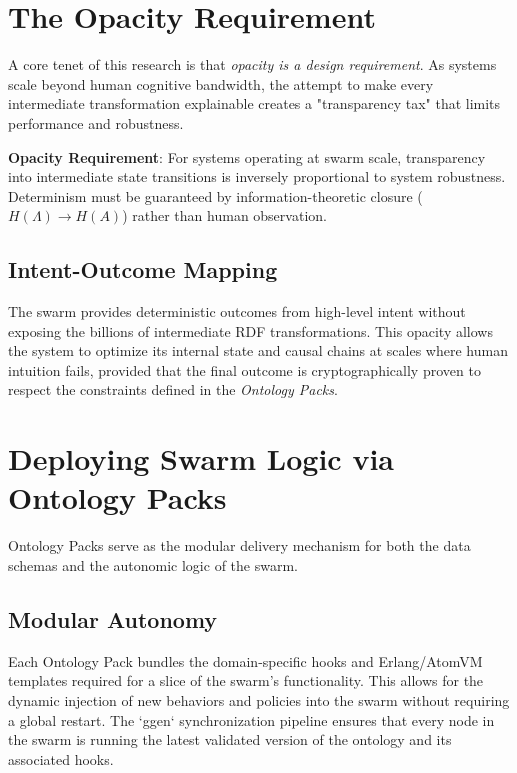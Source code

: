 \section{The Opacity Requirement}

A core tenet of this research is that \textit{opacity is a design requirement}. As systems scale beyond human cognitive bandwidth, the attempt to make every intermediate transformation explainable creates a "transparency tax" that limits performance and robustness.

\begin{tcolorbox}[colback=fusionblue!5!white,colframe=fusionblue!75!black]
    \textbf{Opacity Requirement}: For systems operating at swarm scale, transparency into intermediate state transitions is inversely proportional to system robustness. Determinism must be guaranteed by information-theoretic closure ($H(\Lambda) \to H(A)$) rather than human observation.
\end{tcolorbox}

\subsection{Intent-Outcome Mapping}
The swarm provides deterministic outcomes from high-level intent without exposing the billions of intermediate RDF transformations. This opacity allows the system to optimize its internal state and causal chains at scales where human intuition fails, provided that the final outcome is cryptographically proven to respect the constraints defined in the \textit{Ontology Packs}.

\section{Deploying Swarm Logic via Ontology Packs}

Ontology Packs serve as the modular delivery mechanism for both the data schemas and the autonomic logic of the swarm.

\subsection{Modular Autonomy}
Each Ontology Pack bundles the domain-specific hooks and Erlang/AtomVM templates required for a slice of the swarm's functionality. This allows for the dynamic injection of new behaviors and policies into the swarm without requiring a global restart. The `ggen` synchronization pipeline ensures that every node in the swarm is running the latest validated version of the ontology and its associated hooks.

